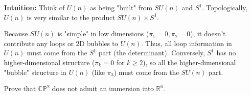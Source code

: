 \begin{solution}
\textbf{Intuition:}
Think of $U(n)$ as being "built" from $SU(n)$ and $S^1$. Topologically, $U(n)$ is very similar to the product $SU(n) \times S^1$.

Because $SU(n)$ is "simple" in low dimensions ($\pi_1=0, \pi_2=0$), it doesn't contribute any loops or 2D bubbles to $U(n)$. Thus, all loop information in $U(n)$ must come from the $S^1$ part (the determinant). Conversely, $S^1$ has no higher-dimensional structure ($\pi_k=0$ for $k \geq 2$), so all the higher-dimensional "bubble" structure in $U(n)$ (like $\pi_3$) must come from the $SU(n)$ part.
\end{solution}

\begin{exercise}
\label{geometry:2025:4}
Prove that $\mathbb{CP}^{2}$ does not admit an immersion into $\mathbb{R}^{6}$.
\end{exercise}

